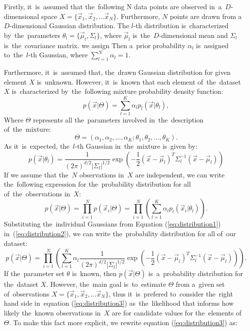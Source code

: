 Firstly, it~is~assumed that the~following N data points are observed in~a~$D$-dimensional space $X=\{\overrightarrow{x}_1,\overrightarrow{x}_2,\dots \overrightarrow{x}_N\}$. Furthermore, $N$ points are drawn from a~$D$-dimensional Gaussian distribution. The $l$-th distribution is~characterized by~the~parameters $\theta_l=\{\overrightarrow{\mu}_l,\Sigma_l\}$, where $\overrightarrow{\mu}_l$ is~the~$D$-dimensional mean and $\Sigma_l$ is~the~covariance matrix. we assign Then a~prior probability $\alpha_l$ is~assigned to~the~$l$-th Gaussian, where $\sum_{l=1}^N \alpha_l=1$.

Furthermore, it~is~assumed that, the~drawn Gaussian distribution for given element $X$ is~unknown. However, it~is~known that each element of~the~dataset $X$ is~characterized by~the~following mixture probability density function:
\begin{equation}
  p(\overrightarrow{x}|\Theta)=\sum_{l=1}^K \alpha_l p_l (\overrightarrow{x}|\theta_l),
\end{equation}
Where $\Theta$ represents all the~parameters involved in~the~description of~the~mixture:
\begin{equation}
  \Theta=(\alpha_1,\alpha_2,\dots,\alpha_K;\theta_1,\theta_2,\dots,\theta_K).
\end{equation}
As it~is~expected, the~$l$-th Gaussian in~the~mixture is~given by:
\begin{equation}
\label{eq:distribution1}
  p(\overrightarrow{x}|\theta_l)=\frac{1}{(2\pi)^{d/2}|\Sigma_l|^{1/2}}\exp{\left(-\frac{1}{2}(\overrightarrow{x}-\overrightarrow{\mu}_l)^T\Sigma_l^{-1}(\overrightarrow{x}-\overrightarrow{\mu}_l)\right)}
\end{equation}
If we assume that the~$N$ observations in~$X$ are independent, we can write the~following expression for the~probability distribution for all of~the~observations in~$X$:
\begin{equation}
\label{eq:distribution2}
   p(\overrightarrow{x}|\Theta)=\prod_{i=1}^Np(\overrightarrow{x}_i|\Theta)=\prod_{i=1}^N\left( \sum_{l=1}^K\alpha_lp_l(\overrightarrow{x}_i|\theta_l) \right).
\end{equation}
Substituting the~individual Gaussians from Equation (\ref{eq:distribution1}) in~(\ref{eq:distribution2}), we can write  the~probability distribution for all of~our dataset:
\begin{equation}
\label{eq:distribution3}
  p(\overrightarrow{x}|\Theta)=\prod_{i=1}^N\left( \sum_{l=1}^K\alpha_l\frac{1}{(2\pi)^{d/2}|\Sigma_l|^{1/2}}\exp{\left(-\frac{1}{2}(\overrightarrow{x}-\overrightarrow{\mu}_l)^T\Sigma_l^{-1}(\overrightarrow{x}-\overrightarrow{\mu}_l)\right)} \right).
\end{equation}
If the~parameter set $\theta$ is~known, then $ p(\overrightarrow{x}|\Theta)$ is~a~probability distribution for the~dataset $X$. However, the~main goal is~to~estimate $\Theta$ from a~given set of~observations $X=\{\overrightarrow{x}_1,\overrightarrow{x}_2,\dots \overrightarrow{x}_N\}$, thus it~is~prefered to~consider the~right hand side in~equation (\ref{eq:distribution3}) as~the~likelihood that informs how likely the~known observations in~$X$ are for candidate values for the~elements of~$\Theta$. To make this fact more explicit, we rewrite equation (\ref{eq:distribution3}) as:
  
